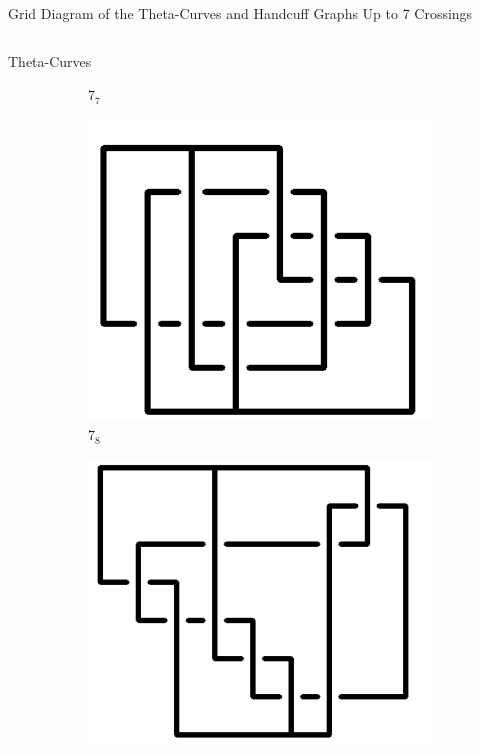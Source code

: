 \documentclass[final]{beamer}
\begin{document}
\begin{frame}[t]
\begin{alertblock}{Grid Diagram of the Theta-Curves and Handcuff Graphs Up to 7 Crossings}
\begin{columns}[t]
\begin{column}{0.5\textwidth}
\begin{alertblock}{Theta-Curves}
\begin{figure}
\begin{subfigure}{0.075\textwidth}
    \caption{$7_{7}$} 
    \end{subfigure}
    \begin{subfigure}{0.075\textwidth}
    \includegraphics[width=\columnwidth]{../Midterm_Poster/grid_diagram/theta_7_8.png}
    \caption{$7_{8}$} 
    \end{subfigure}
    \begin{subfigure}{0.075\textwidth}
    \includegraphics[width=\columnwidth]{../Midterm_Poster/grid_diagram/theta_7_9.png}

\end{subfigure}
\end{figure}
\end{alertblock}
\end{column}
\end{columns}
\end{alertblock}
\end{frame}
\end{document}
